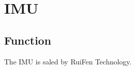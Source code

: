 \setchapterpreamble[u]{\margintoc}
\chapter{IMU}

\section{Function}
The IMU is saled by RuiFen Technology.
